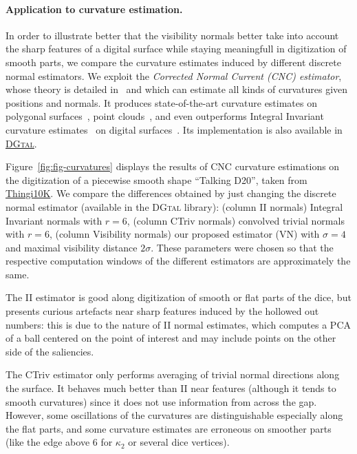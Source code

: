 
\paragraph{Application to curvature estimation.}
In order to illustrate better that the visibility normals better
take into account the sharp features of a digital surface while
staying meaningfull in digitization of smooth parts, we compare
the curvature estimates induced by different discrete normal
estimators. We exploit the \emph{Corrected Normal Current (CNC)
    estimator}, whose theory is detailed in~\cite{lachaud:2022-dcg}
and which can estimate all kinds of curvatures given positions and
normals. It produces state-of-the-art curvature estimates on
polygonal surfaces~\cite{lachaud:2020-cgf}, point clouds~\cite{lachaud:2023-cgf}, and even outperforms Integral Invariant
curvature estimates~\cite{coeurjolly:2014-cviu} on digital
surfaces~\cite{lachaud:2022-dcg}. Its implementation is also
available in    \href{https://dgtal-team.github.io/doc-nightly/moduleCurvatureMeasures.html}{\textsc{DGtal}}.

Figure~\ref{fig:fig-curvatures} displays the results of CNC curvature
estimations on the digitization of a piecewise smooth shape
``Talking D20'', taken from
\href{https://ten-thousand-models.appspot.com/detail.html?file_id=1533028}{Thingi10K}.
We compare the differences obtained by just changing the discrete
normal estimator (available in the \textsc{DGtal} library):
(column II normals) Integral Invariant normals with $r=6$, (column
CTriv normals) convolved trivial normals with $r=6$, (column
Visibility normals) our proposed estimator (VN) with $\sigma=4$ and
maximal visibility distance $2\sigma$. These parameters were
chosen so that the respective computation windows of the different
estimators are approximately the same.

The II estimator is good along digitization of smooth or flat parts of
the dice, but presents curious artefacts near sharp features
induced by the hollowed out numbers: this is due to the nature of
II normal estimates, which computes a PCA of a ball centered on
the point of interest and may include points on the other side of
the saliencies.

The CTriv estimator only performs averaging of trivial normal
directions along the surface. It behaves much better than II near
features (although it tends to smooth curvatures) since it does
not use information from across the gap. However, some oscillations
of the curvatures are distinguishable especially along the flat
parts, and some curvature estimates are erroneous on smoother
parts (like the edge above 6 for $\kappa_2$ or several dice
vertices).

